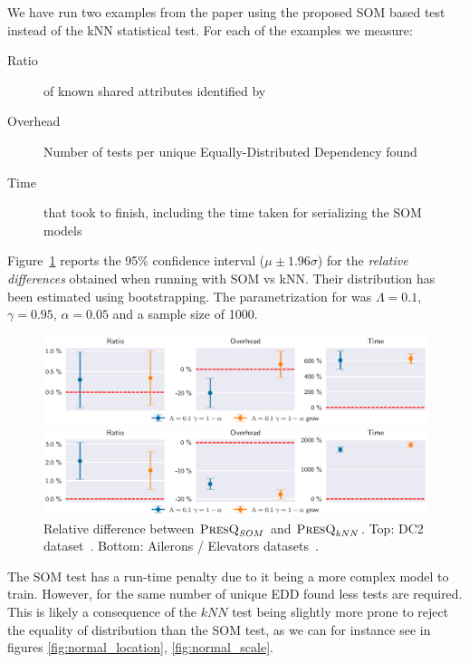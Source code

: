 We have run two examples from the \PresQ paper using the proposed \gls{SOM}  based test
instead of the \gls{kNN} statistical test. For each of the examples we measure:

\begin{description}
    \item[Ratio] of known shared attributes identified by \PresQ
    \item[Overhead] Number of tests per unique Equally-Distributed Dependency found
    \item[Time] that took \PresQ to finish, including the time taken for serializing the \gls{SOM}  models
\end{description}

Figure~\ref{fig:presq_som} reports the 95\% confidence interval ($\mu \pm 1.96 \sigma$)
for the \emph{relative differences} obtained when running with \gls{SOM}  vs
\gls{kNN}. Their distribution has been estimated using bootstrapping. The parametrization for
\PresQ was $\Lambda = 0.1$, $\gamma=0.95$, $\alpha=0.05$ and a sample size of 1000.

\begin{figure}[ht]
    \centering
    \includegraphics[width=\textwidth]{images/6_som/presq_som.eps}
    
    \includegraphics[width=\textwidth]{images/6_som/presq_som_aileron.eps}
    \caption[Relative difference between $\PresQ_{SOM}$ and $\PresQ_{kNN}$.]{
        Relative difference between $\PresQ_{SOM}$ and $\PresQ_{kNN}$.
        Top: DC2 dataset~\cite{EuclidDesprez2020}.
        Bottom: Ailerons / Elevators datasets~\cite{alcala2011keel}.
    }
    \label{fig:presq_som}
\end{figure}

The \gls{SOM}  test has a run-time penalty due to it being a more complex model to train.
However, for the same number of unique EDD found less tests are required. This is likely a consequence of
the $kNN$ test being slightly more prone to reject the equality of distribution than the \gls{SOM} 
test, as we can for instance see in figures \ref{fig:normal_location}, \ref{fig:normal_scale}.

